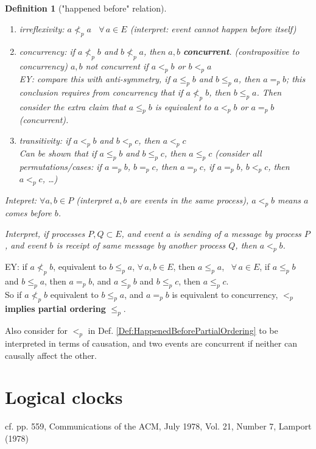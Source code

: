 \documentclass[10pt]{amsart}
\newtheorem{definition}{Definition}
\begin{document}
\begin{multicols*}{2}
\begin{definition}["happened before" relation]
	\begin{enumerate}
		\item irreflexivity: $a \not<_p a$ \, $\forall\, a \in E$ (interpret: event cannot happen before itself)
		\item concurrency: if $a \not<_p b$ and $b\not<_p a$, then $a,b$ \textbf{concurrent}.
		(contrapositive to concurrency) $a,b$ not concurrent if $a <_p b$ or $b<_p a$ \\
		
		EY: compare this with anti-symmetry, if $a \leq_p b$ and $b\leq_p a$, then $a =_p b$; this conclusion requires from concurrency that if $a \not<_p b$, then $b\leq_p a$. Then consider the extra claim that $a\leq_p b$ is equivalent to $a <_p b$ or $a =_p b$ (concurrent).
		\item transitivity: if $a<_p b$ and $b<_p c$, then $a<_pc$ \\
		
		Can be shown that if $a\leq_p b$ and $b\leq_pc$, then $a\leq_p c$ (consider all permutations/cases: if $a=_p b$, $b=_pc$, then $a=_pc$, if $a=_p b$, $b<_p c$, then $a<_p c$, \dots)
	\end{enumerate}
Intepret: $\forall a, b \in P$ (interpret $a,b$ are events in the same process), $a<_p b$ means $a$ comes before $b$. 

Interpret, if processes $P, Q \subset E$, and event $a$ is sending of a message by process $P$, and event $b$ is receipt of same message by another process $Q$, then $a <_p b$.
\end{definition}

EY: if $a \not<_p b$, equivalent to $b \leq_p a$, $\forall \, a, b\in E$, then $a \leq_p a$, \, $\forall \, a \in E$, if $a\leq_p b$ and $b\leq_p a$, then $a=_p b$, and $a\leq_p b$ and $b\leq_p c$, then $a \leq_p c$. \\
So if $a \not<_p b$ equivalent to $b\leq_p a$, and $a=_p b$ is equivalent to concurrency, $<_p$ \textbf{implies partial ordering} $\leq_p$.

Also consider for $<_p$ in Def. \ref{Def:HappenedBeforePartialOrdering} to be interpreted in terms of causation, and two events are concurrent if neither can causally affect the other.

\section{Logical clocks}

cf. pp. 559, Communications of the ACM, July 1978, Vol. 21, Number 7, Lamport (1978) \cite{Lamp1978}


\end{multicols*}
\end{document}
